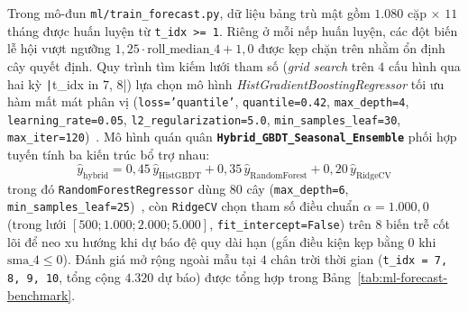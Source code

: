 Trong mô-đun \texttt{ml/train_forecast.py}, dữ liệu bảng trù mật gồm $1.080$ cặp $\times$ $11$ tháng được huấn luyện từ \texttt{t_idx >= 1}. Riêng ở mỗi nếp huấn luyện, các đột biến lễ hội vượt ngưỡng $1{,}25 \cdot \text{roll\_median\_4} + 1{,}0$ được kẹp chặn trên nhằm ổn định cây quyết định. Quy trình tìm kiếm lưới tham số (\textit{grid search} trên $4$ cấu hình qua hai kỳ \texttt|t_idx in {7, 8}|) lựa chọn mô hình \textit{HistGradientBoostingRegressor} tối ưu hàm mất mát phân vị (\texttt{loss='quantile'}, \texttt{quantile=0.42}, \texttt{max_depth=4}, \texttt{learning_rate=0.05}, \texttt{l2\_\allowbreak{}regularization=5.0}, \texttt{min\_\allowbreak{}samples\_\allowbreak{}leaf=30}, \texttt{max_iter=120})~\cite{friedman2001gbm}. Mô hình quán quân \textbf{\texttt{Hybrid_GBDT_Seasonal_Ensemble}} phối hợp tuyến tính ba kiến trúc bổ trợ nhau:
\begin{equation}
	\hat{y}_{\text{hybrid}} = 0{,}45\,\hat{y}_{\text{HistGBDT}} + 0{,}35\,\hat{y}_{\text{RandomForest}} + 0{,}20\,\hat{y}_{\text{RidgeCV}}
\end{equation}
trong đó \texttt{RandomForestRegressor} dùng $80$ cây (\texttt{max_depth=6}, \texttt{min_samples_leaf=25})~\cite{breiman2001rf}, còn \texttt{RidgeCV} chọn tham số điều chuẩn $\alpha = 1.000{,}0$ (trong lưới $[500; 1.000; 2.000; 5.000]$, \texttt{fit_intercept=False}) trên $8$ biến trễ cốt lõi để neo xu hướng khi dự báo đệ quy dài hạn (gắn điều kiện kẹp bằng $0$ khi $\text{sma\_4} \le 0$). Đánh giá mở rộng ngoài mẫu tại $4$ chân trời thời gian (\texttt{t_idx = 7, 8, 9, 10}, tổng cộng $4.320$ dự báo) được tổng hợp trong Bảng~\ref{tab:ml-forecast-benchmark}.

